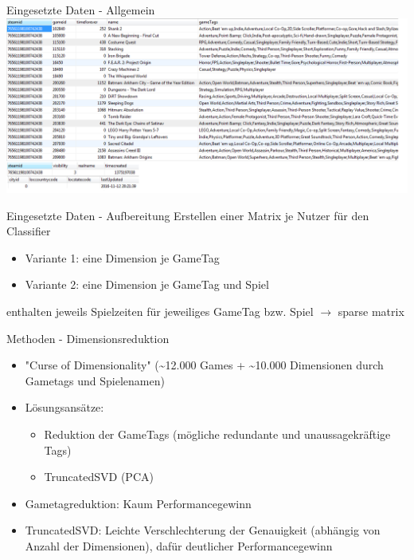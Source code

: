 \documentclass[12pt]{beamer}
\begin{document}
\begin{frame}{Eingesetzte Daten - Allgemein}
	\includegraphics[scale=0.5]{img/steam_richard_info.png}
\end{frame}


\begin{frame}{Eingesetzte Daten - Aufbereitung}
	Erstellen einer Matrix je Nutzer für den Classifier
	\begin{itemize}
		\item Variante 1: eine Dimension je GameTag
		\item Variante 2: eine Dimension je GameTag und Spiel
	\end{itemize}
	enthalten jeweils Spielzeiten für jeweiliges GameTag bzw. Spiel
	$\rightarrow$ sparse matrix
	
\end{frame}


\begin{frame}{Methoden - Dimensionsreduktion}
	\begin{itemize}
	\item "Curse of Dimensionality" (\textasciitilde 12.000 Games + \textasciitilde 10.000 Dimensionen durch Gametags und Spielenamen)
	\item Lösungsansätze:
		\begin{itemize}
		\item Reduktion der GameTags (mögliche redundante und unaussagekräftige Tags)
		\item TruncatedSVD (PCA)
		\end{itemize}
	\item Gametagreduktion: Kaum Performancegewinn
	\item TruncatedSVD: Leichte Verschlechterung der Genauigkeit (abhängig von Anzahl der Dimensionen), dafür deutlicher Performancegewinn
	\end{itemize}
\end{frame}
\end{document}
